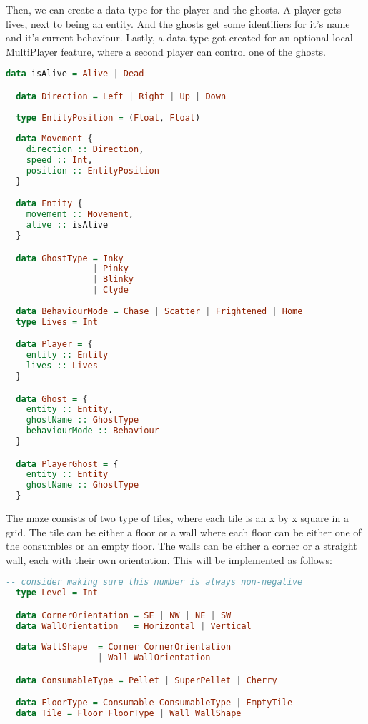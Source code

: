 \documentclass[11pt]{Article}
\begin{document}
Then, we can create a data type for the player and the ghosts. A player gets lives, next to being an entity. And the ghosts get some identifiers for it's name and it's current behaviour. Lastly, a data type got created for an optional local MultiPlayer feature, where a second player can control one of the ghosts.

\begin{lstlisting}[language=Haskell]
  data isAlive = Alive | Dead

  data Direction = Left | Right | Up | Down
  
  type EntityPosition = (Float, Float)
  
  data Movement {
    direction :: Direction,
    speed :: Int,
    position :: EntityPosition
  }

  data Entity {
    movement :: Movement,
    alive :: isAlive
  }

  data GhostType = Inky 
                 | Pinky 
                 | Blinky 
                 | Clyde 
  
  data BehaviourMode = Chase | Scatter | Frightened | Home
  type Lives = Int

  data Player = {
    entity :: Entity
    lives :: Lives
  }

  data Ghost = {
    entity :: Entity,
    ghostName :: GhostType
    behaviourMode :: Behaviour
  }

  data PlayerGhost = {
    entity :: Entity
    ghostName :: GhostType
  }
\end{lstlisting}

\noindent The maze consists of two type of tiles, where each tile is an x by x square in a grid. The tile can be either a floor or a wall where each floor can be either one of the consumbles or an empty floor. The walls can be either a corner or a straight wall, each with their own orientation. This will be implemented as follows:
\begin{lstlisting}[language=Haskell]
  -- consider making sure this number is always non-negative
  type Level = Int

  data CornerOrientation = SE | NW | NE | SW
  data WallOrientation   = Horizontal | Vertical
  
  data WallShape  = Corner CornerOrientation
                  | Wall WallOrientation 

  data ConsumableType = Pellet | SuperPellet | Cherry

  data FloorType = Consumable ConsumableType | EmptyTile
  data Tile = Floor FloorType | Wall WallShape
\end{lstlisting}
\end{document}
